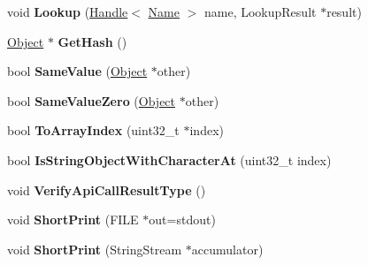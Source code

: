 \begin{DoxyCompactItemize}
\item 
\hypertarget{classv8_1_1internal_1_1_object_a79103a114da43c555f30f8f605be355a}{}void {\bfseries Lookup} (\hyperlink{classv8_1_1internal_1_1_handle}{Handle}$<$ \hyperlink{classv8_1_1internal_1_1_name}{Name} $>$ name, Lookup\+Result $\ast$result)\label{classv8_1_1internal_1_1_object_a79103a114da43c555f30f8f605be355a}

\item 
\hypertarget{classv8_1_1internal_1_1_object_a1705a523fa7ddd6974100c014767b718}{}\hyperlink{classv8_1_1internal_1_1_object}{Object} $\ast$ {\bfseries Get\+Hash} ()\label{classv8_1_1internal_1_1_object_a1705a523fa7ddd6974100c014767b718}

\item 
\hypertarget{classv8_1_1internal_1_1_object_a4218e7b873b8150ee86e5a5d2572add7}{}bool {\bfseries Same\+Value} (\hyperlink{classv8_1_1internal_1_1_object}{Object} $\ast$other)\label{classv8_1_1internal_1_1_object_a4218e7b873b8150ee86e5a5d2572add7}

\item 
\hypertarget{classv8_1_1internal_1_1_object_a4d8b23dea1291a4c315deb06bf17b495}{}bool {\bfseries Same\+Value\+Zero} (\hyperlink{classv8_1_1internal_1_1_object}{Object} $\ast$other)\label{classv8_1_1internal_1_1_object_a4d8b23dea1291a4c315deb06bf17b495}

\item 
\hypertarget{classv8_1_1internal_1_1_object_aac484694d24998e045aabfc4757d07b6}{}bool {\bfseries To\+Array\+Index} (uint32\+\_\+t $\ast$index)\label{classv8_1_1internal_1_1_object_aac484694d24998e045aabfc4757d07b6}

\item 
\hypertarget{classv8_1_1internal_1_1_object_a8319b42c27f93c8aa59e621e9593e37a}{}bool {\bfseries Is\+String\+Object\+With\+Character\+At} (uint32\+\_\+t index)\label{classv8_1_1internal_1_1_object_a8319b42c27f93c8aa59e621e9593e37a}

\item 
\hypertarget{classv8_1_1internal_1_1_object_a747f38950d5bc130fe841793d9296233}{}void {\bfseries Verify\+Api\+Call\+Result\+Type} ()\label{classv8_1_1internal_1_1_object_a747f38950d5bc130fe841793d9296233}

\item 
\hypertarget{classv8_1_1internal_1_1_object_a606e3708ccfa1723658f9dcf85d3f120}{}void {\bfseries Short\+Print} (F\+I\+L\+E $\ast$out=stdout)\label{classv8_1_1internal_1_1_object_a606e3708ccfa1723658f9dcf85d3f120}

\item 
\hypertarget{classv8_1_1internal_1_1_object_ab2fafb6a18ed0bd9d8a5f7304d171f79}{}void {\bfseries Short\+Print} (String\+Stream $\ast$accumulator)\label{classv8_1_1internal_1_1_object_ab2fafb6a18ed0bd9d8a5f7304d171f79}

\end{DoxyCompactItemize}
